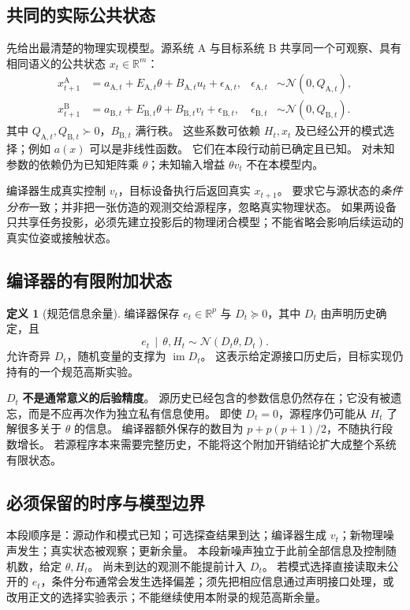 \documentclass[UTF8,fontset=fandol,11pt,a4paper]{ctexart}
\newcommand{\R}{\mathbb R}
\newcommand{\N}{\mathcal N}
\newcommand{\im}{\operatorname{im}}
\newcommand{\given}{\,\mid\,}
\theoremstyle{definition}
\newtheorem{definition}[theorem]{定义}
\theoremstyle{remark}
\numberwithin{equation}{section}
\begin{document}
\subsection{共同的实际公共状态}
先给出最清楚的物理实现模型。源系统 A 与目标系统 B 共享同一个可观察、具有相同语义的公共状态 $x_t\in\R^m$：
\begin{align}
 x_{t+1}^{\mathrm A}
 &=a_{\mathrm A,t}+E_{\mathrm A,t}\theta+B_{\mathrm A,t}u_t+\epsilon_{\mathrm A,t},
 &\epsilon_{\mathrm A,t}&\sim\N(0,Q_{\mathrm A,t}),\label{eq:sourceplant}\\
 x_{t+1}^{\mathrm B}
 &=a_{\mathrm B,t}+E_{\mathrm B,t}\theta+B_{\mathrm B,t}v_t+\epsilon_{\mathrm B,t},
 &\epsilon_{\mathrm B,t}&\sim\N(0,Q_{\mathrm B,t}).\label{eq:targetplant}
\end{align}
其中 $Q_{\mathrm A,t},Q_{\mathrm B,t}\succ0$，$B_{\mathrm B,t}$ 满行秩。
这些系数可依赖 $H_t,x_t$ 及已经公开的模式选择；例如 $a(x)$ 可以是非线性函数。
它们在本段行动前已确定且已知。
对未知参数的依赖仍为已知矩阵乘 $\theta$；未知输入增益 $\theta v_t$ 不在本模型内。

编译器生成真实控制 $v_t$，目标设备执行后返回真实 $x_{t+1}$。
要求它与源状态的\emph{条件分布}一致；并非把一张仿造的观测交给源程序，忽略真实物理状态。
如果两设备只共享任务投影，必须先建立投影后的物理闭合模型；不能省略会影响后续运动的真实位姿或接触状态。

\subsection{编译器的有限附加状态}
\begin{definition}[规范信息余量]
编译器保存 $e_t\in\R^p$ 与 $D_t\succeq0$，其中 $D_t$ 由声明历史确定，且
\begin{equation}
 e_t\given\theta,H_t\sim\N(D_t\theta,D_t).
 \label{eq:buffer}
\end{equation}
允许奇异 $D_t$，随机变量的支撑为 $\im D_t$。
这表示给定源接口历史后，目标实现仍持有的一个规范高斯实验。
\end{definition}

$D_t$ \textbf{不是通常意义的后验精度}。
源历史已经包含的参数信息仍然存在；它没有被遗忘，而是不应再次作为独立私有信息使用。
即使 $D_t=0$，源程序仍可能从 $H_t$ 了解很多关于 $\theta$ 的信息。
编译器额外保存的数目为 $p+p(p+1)/2$，不随执行段数增长。
若源程序本来需要完整历史，不能将这个附加开销结论扩大成整个系统有限状态。

\subsection{必须保留的时序与模型边界}
本段顺序是：源动作和模式已知；可选探查结果到达；编译器生成 $v_t$；新物理噪声发生；真实状态被观察；更新余量。
本段新噪声独立于此前全部信息及控制随机数，给定 $\theta,H_t$。
尚未到达的观测不能提前计入 $D_t$。
若模式选择直接读取未公开的 $e_t$，条件分布通常会发生选择偏差；须先把相应信息通过声明接口处理，或改用正文的选择实验表示；不能继续使用本附录的规范高斯余量。
\end{document}
